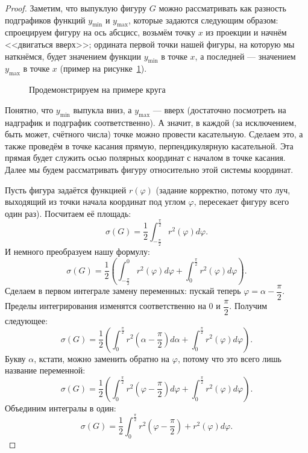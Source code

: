 \begin{proof}
	Заметим, что выпуклую фигуру \(G\) можно рассматривать как разность подграфиков функций \(y_{\min}\) и \(y_{\max}\),  которые задаются следующим образом: спроецируем фигуру на ось абсцисс, возьмём точку \(x\) из проекции и начнём <<двигаться вверх>>; ордината первой точки нашей фигуры, на которую мы наткнёмся, будет значением функции \(y_{\min}\) в точке \(x\), а последней --- значением  \(y_{\max}\) в точке \(x\) (пример на рисунке~\ref{kroog}).
	\begin{figure}
		\caption{Продемонстрируем на примере круга}
		\label{kroog}
	\end{figure}
	
	Понятно, что \(y_{\min}\) выпукла вниз, а \(y_{\max}\) --- вверх (достаточно посмотреть на надграфик и подграфик соответственно). А значит, в каждой (за исключением, быть может, счётного числа) точке можно провести касательную. Сделаем это, а также проведём в точке касания прямую, перпендикулярную касательной. Эта прямая будет служить осью полярных координат с началом в точке касания. Далее мы будем рассматривать фигуру относительно этой системы координат.
	
	Пусть фигура задаётся функцией \(r(\varphi)\) (задание корректно, потому что луч, выходящий из точки начала координат под углом \(\varphi\), пересекает фигуру всего один раз). Посчитаем её площадь: \[
		\sigma(G) = \frac{1}{2} \int_{-\frac{\pi}{2}}^{\frac{\pi}{2}} r^2(\varphi) d\varphi.
	\]
	И немного преобразуем нашу формулу: \[
		\sigma(G) = \frac{1}{2} \left(\int_{-\frac{\pi}{2}}^{0} r^2(\varphi) d\varphi + \int_{0}^{\frac{\pi}{2}} r^2(\varphi) d\varphi \right).
	\]
	Сделаем в первом интеграле замену переменных: пускай теперь \(\varphi = \alpha - \dfrac{\pi}{2}\). Пределы интегрирования изменятся соответственно на \(0\) и \(\dfrac{\pi}{2}\). Получим следующее: \[
		\sigma(G) = \frac{1}{2} \left(\int_{0}^{\frac{\pi}{2}} r^2 \left(\alpha - \frac{\pi}{2} \right) d\alpha + \int_{0}^{\frac{\pi}{2}} r^2(\varphi) d\varphi \right).
	\]
	Букву \(\alpha\), кстати, можно заменить обратно на \(\varphi\), потому что это всего лишь название переменной: \[
		\sigma(G) = \frac{1}{2} \left(\int_{0}^{\frac{\pi}{2}} r^2 \left(\varphi - \frac{\pi}{2} \right) d\varphi + \int_{0}^{\frac{\pi}{2}} r^2(\varphi) d\varphi \right).
	\]
	Объединим интегралы в один: \[
		\sigma(G) = \frac{1}{2} \int_{0}^{\frac{\pi}{2}} r^2 \left(\varphi - \frac{\pi}{2} \right) +  r^2(\varphi) d\varphi.
	\]
	

\end{proof}
